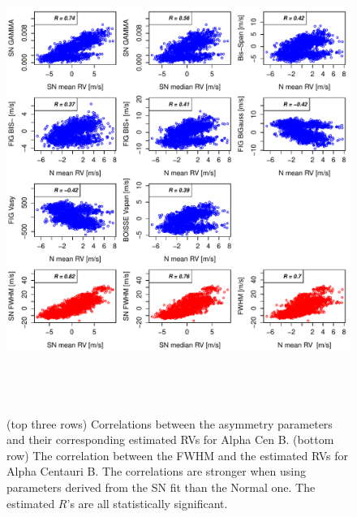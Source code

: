 \documentclass{aa}
\begin{document}
\begin{figure}[htbp]
\begin{center}
\includegraphics[height = 6in]{HD12862_[4]Comparison_para.pdf}  
   \caption{(top three rows) Correlations between the asymmetry parameters and their corresponding estimated RVs for Alpha Cen B. 
(bottom row) The correlation between the FWHM and the estimated RVs for Alpha Centauri B. The correlations are stronger when using parameters derived from the SN fit than the Normal one. The estimated $R$'s are all statistically significant.} 
   \label{fig:alphacent:corrPlot}
\end{center}
\end{figure}
%
\end{document}
